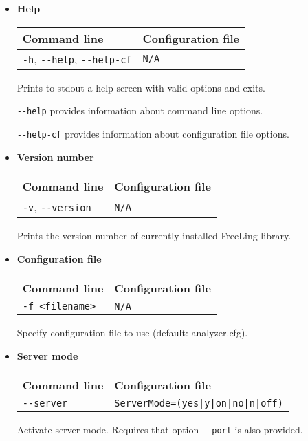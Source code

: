 \documentclass[a4paper]{book}
\begin{document}
\begin{itemize}

\item {\bf Help}

\begin{tabular}{|l|l|}
Command line       & Configuration file   \\ \hline
\verb#-h#, \verb#--help#,  \verb#--help-cf#    &  {\tt N/A}   \\ \hline
\end{tabular}

 Prints to stdout a help screen with valid options and exits.

 \noindent \verb#--help# provides information about command line options.

 \noindent \verb#--help-cf# provides information about configuration file options. 

\item {\bf Version number}

\begin{tabular}{|l|l|}
Command line       & Configuration file   \\ \hline
\verb#-v#, \verb#--version#   &  {\tt N/A}   \\ \hline
\end{tabular}

 Prints the version number of currently installed FreeLing library.

\item {\bf Configuration file}

\begin{tabular}{|l|l|}
Command line       & Configuration file   \\ \hline
\verb#-f <filename>#  &  {\tt N/A}        \\ \hline 
\end{tabular}

 Specify configuration file to use (default: analyzer.cfg).



\item {\bf Server mode}

\begin{tabular}{|l|l|}
Command line       & Configuration file   \\ \hline
\verb#--server#  &  \verb#ServerMode=(yes|y|on|no|n|off)#        \\ \hline 
\end{tabular}

 Activate server mode. 
 Requires that option \verb#--port# is also provided.


\end{itemize}
\end{document}
